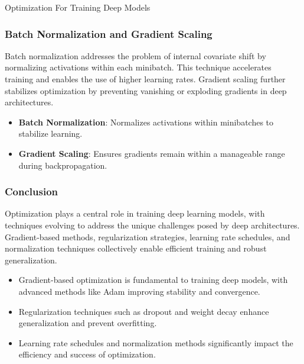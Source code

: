 \begin{notes}{Optimization For Training Deep Models}
    \subsubsection*{Batch Normalization and Gradient Scaling}
    
    Batch normalization addresses the problem of internal covariate shift by normalizing activations within each minibatch. This technique accelerates training and enables the use of higher learning rates. Gradient 
    scaling further stabilizes optimization by preventing vanishing or exploding gradients in deep architectures.
    
    \begin{highlight}
        \begin{itemize}
            \item \textbf{Batch Normalization}: Normalizes activations within minibatches to stabilize learning.
            \item \textbf{Gradient Scaling}: Ensures gradients remain within a manageable range during backpropagation.
        \end{itemize}
    \end{highlight}
    
    \subsubsection*{Conclusion}
    
    Optimization plays a central role in training deep learning models, with techniques evolving to address the unique challenges posed by deep architectures. Gradient-based methods, regularization strategies, 
    learning rate schedules, and normalization techniques collectively enable efficient training and robust generalization.
    
    \begin{highlight}
        \begin{itemize}
            \item Gradient-based optimization is fundamental to training deep models, with advanced methods like Adam improving stability and convergence.
            \item Regularization techniques such as dropout and weight decay enhance generalization and prevent overfitting.
            \item Learning rate schedules and normalization methods significantly impact the efficiency and success of optimization.
        \end{itemize}
    \end{highlight}
\end{notes}